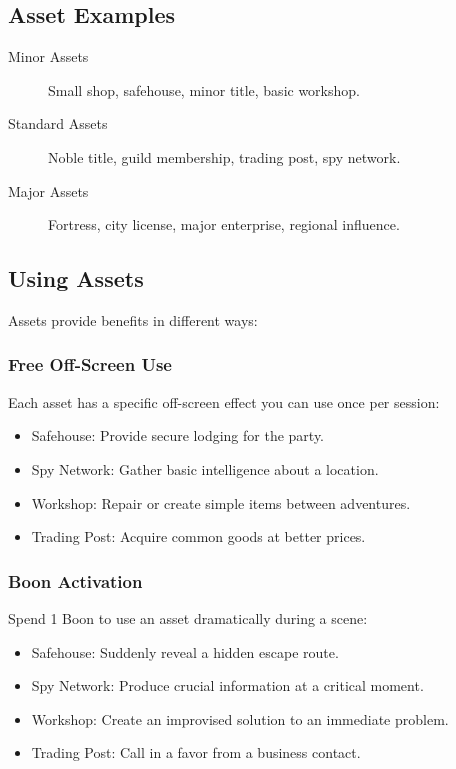 \documentclass[11pt,twoside,openany]{book}
\begin{document}
\subsection*{Asset Examples}

\begin{description}
\item[Minor Assets] Small shop, safehouse, minor title, basic workshop.
\item[Standard Assets] Noble title, guild membership, trading post, spy network.
\item[Major Assets] Fortress, city license, major enterprise, regional influence.
\end{description}

\subsection*{Using Assets}

Assets provide benefits in different ways:

\subsubsection*{Free Off-Screen Use}

Each asset has a specific off-screen effect you can use once per session:
\begin{itemize}
\item Safehouse: Provide secure lodging for the party.
\item Spy Network: Gather basic intelligence about a location.
\item Workshop: Repair or create simple items between adventures.
\item Trading Post: Acquire common goods at better prices.
\end{itemize}

\subsubsection*{Boon Activation}

Spend 1 Boon to use an asset dramatically during a scene:
\begin{itemize}
\item Safehouse: Suddenly reveal a hidden escape route.
\item Spy Network: Produce crucial information at a critical moment.
\item Workshop: Create an improvised solution to an immediate problem.
\item Trading Post: Call in a favor from a business contact.
\end{itemize}
\end{document}
